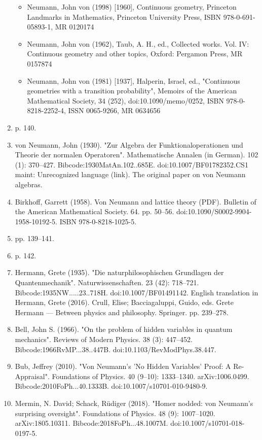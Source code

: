 \begin{enumerate}
\begin{itemize}
\item Neumann, John von (1998) [1960], Continuous geometry, Princeton Landmarks in Mathematics, Princeton University Press, ISBN 978-0-691-05893-1, MR 0120174
\item Neumann, John von (1962), Taub, A. H., ed., Collected works. Vol. IV: Continuous geometry and other topics, Oxford: Pergamon Press, MR 0157874
\item Neumann, John von (1981) [1937], Halperin, Israel, ed., "Continuous geometries with a transition probability", Memoirs of the American Mathematical Society, 34 (252), doi:10.1090/memo/0252, ISBN 978-0-8218-2252-4, ISSN 0065-9266, MR 0634656
\end{itemize}
\item  p. 140.
\item von Neumann, John (1930). "Zur Algebra der Funktionaloperationen und Theorie der normalen Operatoren". Mathematische Annalen (in German). 102 (1): 370–427. Bibcode:1930MatAn.102..685E. doi:10.1007/BF01782352.CS1 maint: Unrecognized language (link). The original paper on von Neumann algebras.
\item Birkhoff, Garrett (1958). Von Neumann and lattice theory (PDF). Bulletin of the American Mathematical Society. 64. pp. 50–56. doi:10.1090/S0002-9904-1958-10192-5. ISBN 978-0-8218-1025-5.
\item  pp. 139–141.
\item  p. 142.
\item Hermann, Grete (1935). "Die naturphilosophischen Grundlagen der Quantenmechanik". Naturwissenschaften. 23 (42): 718–721. Bibcode:1935NW.....23..718H. doi:10.1007/BF01491142. English translation in Hermann, Grete (2016). Crull, Elise; Bacciagaluppi, Guido, eds. Grete Hermann — Between physics and philosophy. Springer. pp. 239–278.
\item Bell, John S. (1966). "On the problem of hidden variables in quantum mechanics". Reviews of Modern Physics. 38 (3): 447–452. Bibcode:1966RvMP...38..447B. doi:10.1103/RevModPhys.38.447.
\item Bub, Jeffrey (2010). "Von Neumann's 'No Hidden Variables' Proof: A Re-Appraisal". Foundations of Physics. 40 (9–10): 1333–1340. arXiv:1006.0499. Bibcode:2010FoPh...40.1333B. doi:10.1007/s10701-010-9480-9.
\item Mermin, N. David; Schack, Rüdiger (2018). "Homer nodded: von Neumann's surprising oversight". Foundations of Physics. 48 (9): 1007–1020. arXiv:1805.10311. Bibcode:2018FoPh...48.1007M. doi:10.1007/s10701-018-0197-5.

\end{enumerate}
